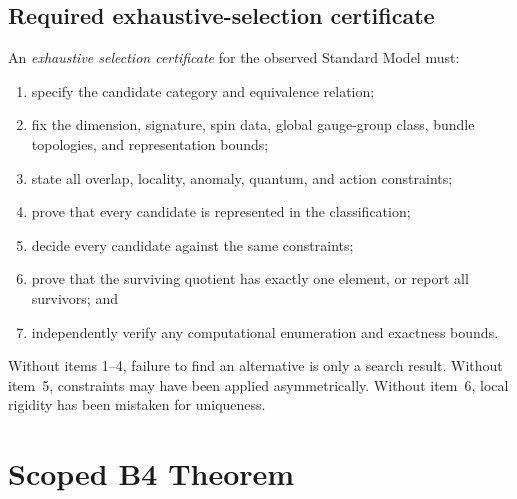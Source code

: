 \documentclass[11pt]{article}
\begin{document}
\subsection{Required exhaustive-selection certificate}

\begin{definition}\label{def:selection}
An \emph{exhaustive selection certificate} for the observed Standard Model
must:
\begin{enumerate}
\item specify the candidate category and equivalence relation;
\item fix the dimension, signature, spin data, global gauge-group class, bundle
topologies, and representation bounds;
\item state all overlap, locality, anomaly, quantum, and action constraints;
\item prove that every candidate is represented in the classification;
\item decide every candidate against the same constraints;
\item prove that the surviving quotient has exactly one element, or report all
survivors; and
\item independently verify any computational enumeration and exactness bounds.
\end{enumerate}
\end{definition}

Without items 1--4, failure to find an alternative is only a search result.
Without item~5, constraints may have been applied asymmetrically.  Without
item~6, local rigidity has been mistaken for uniqueness.

\section{Scoped B4 Theorem}
\end{document}
